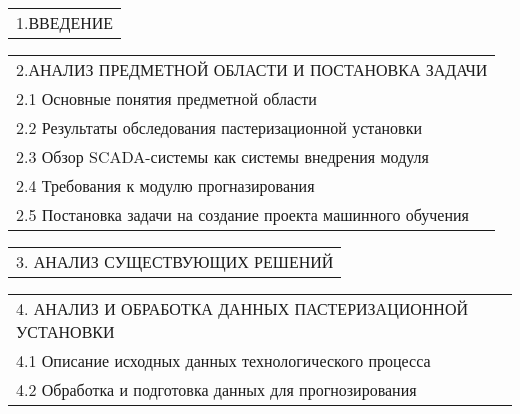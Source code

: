 \documentclass[12pt, А4]{article} %
\begin{document}
\begin{FlushLeft}
    \begin{tabular}{p{17.25cm}} %
        \textsf{1.ВВЕДЕНИЕ} \vspace{1pt} \hline \\
    \end{tabular} %

    \begin{tabular}{p{17.25cm}} %
        \textsf{2.АНАЛИЗ ПРЕДМЕТНОЙ ОБЛАСТИ И ПОСТАНОВКА ЗАДАЧИ} \vspace{1pt} \hline \\
        \hspace{0.5cm}\textsf{2.1 Основные понятия предметной области} \vspace{1pt} \hline \\
        \hspace{0.5cm}\textsf{2.2 Результаты обследования пастеризационной установки} \vspace{1pt} \hline \\
        \hspace{0.5cm}\textsf{2.3 Обзор SCADA-системы как системы внедрения модуля} \vspace{1pt} \hline \\
        \hspace{0.5cm}\textsf{2.4 Требования к модулю прогназирования} \vspace{1pt} \hline \\
        \hspace{0.5cm}\textsf{2.5 Постановка задачи на создание проекта машинного обучения} \vspace{1pt} \hline \\
    \end{tabular} %

    \begin{tabular}{p{17.25cm}} %
        \textsf{3. АНАЛИЗ СУЩЕСТВУЮЩИХ РЕШЕНИЙ} \vspace{1pt} \hline \\
    \end{tabular} %

    \begin{tabular}{p{17.25cm}} %
        \textsf{4. АНАЛИЗ И ОБРАБОТКА ДАННЫХ ПАСТЕРИЗАЦИОННОЙ УСТАНОВКИ} \vspace{1pt} \hline \\
        \hspace{0.5cm}\textsf{4.1 Описание исходных данных технологического процесса} \vspace{1pt} \hline \\
        \hspace{0.5cm}\textsf{4.2 Обработка и подготовка данных для прогнозирования} \vspace{1pt} \hline \\
    \end{tabular} %


\end{FlushLeft}
\end{document}
